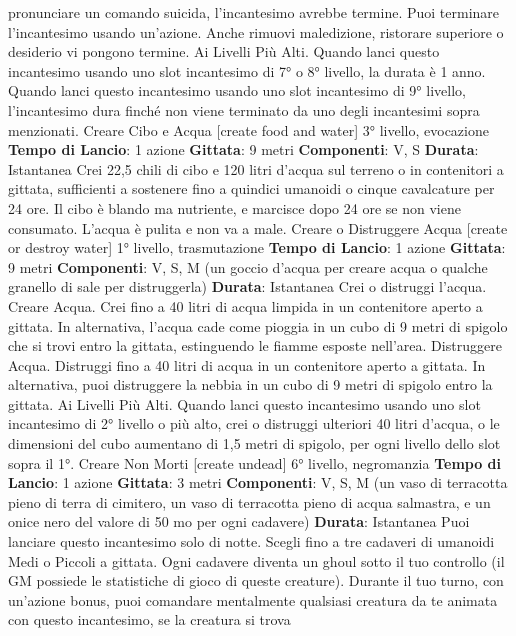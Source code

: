 \begin{multicols}{2}
pronunciare un comando suicida, l’incantesimo avrebbe
termine.
Puoi terminare l’incantesimo usando un’azione. Anche
rimuovi maledizione, ristorare superiore o desiderio vi
pongono termine.
Ai Livelli Più Alti. Quando lanci questo incantesimo
usando uno slot incantesimo di 7° o 8° livello, la durata
è 1 anno. Quando lanci questo incantesimo usando uno
slot incantesimo di 9° livello, l’incantesimo dura finché
non viene terminato da uno degli incantesimi sopra
menzionati.
Creare Cibo e Acqua
[create food and water]
3° livello, evocazione
\textbf{Tempo di Lancio}: 1 azione
\textbf{Gittata}: 9 metri
\textbf{Componenti}: V, S
\textbf{Durata}: Istantanea
Crei 22,5 chili di cibo e 120 litri d’acqua sul terreno o in
contenitori a gittata, sufficienti a sostenere fino a
quindici umanoidi o cinque cavalcature per 24 ore. Il
cibo è blando ma nutriente, e marcisce dopo 24 ore se
non viene consumato. L’acqua è pulita e non va a male.
Creare o Distruggere Acqua
[create or destroy water]
1° livello, trasmutazione
\textbf{Tempo di Lancio}: 1 azione
\textbf{Gittata}: 9 metri
\textbf{Componenti}: V, S, M (un goccio d’acqua per creare
acqua o qualche granello di sale per distruggerla)
\textbf{Durata}: Istantanea
Crei o distruggi l’acqua.
Creare Acqua. Crei fino a 40 litri di acqua limpida in un
contenitore aperto a gittata. In alternativa, l’acqua cade
come pioggia in un cubo di 9 metri di spigolo che si trovi
entro la gittata, estinguendo le fiamme esposte
nell’area.
Distruggere Acqua. Distruggi fino a 40 litri di acqua in
un contenitore aperto a gittata. In alternativa, puoi
distruggere la nebbia in un cubo di 9 metri di spigolo
entro la gittata.
Ai Livelli Più Alti. Quando lanci questo incantesimo
usando uno slot incantesimo di 2° livello o più alto, crei
o distruggi ulteriori 40 litri d’acqua, o le dimensioni del
cubo aumentano di 1,5 metri di spigolo, per ogni livello
dello slot sopra il 1°.
Creare Non Morti
[create undead]
6° livello, negromanzia
\textbf{Tempo di Lancio}: 1 azione
\textbf{Gittata}: 3 metri
\textbf{Componenti}: V, S, M (un vaso di terracotta pieno di
terra di cimitero, un vaso di terracotta pieno di acqua
salmastra, e un onice nero del valore di 50 mo per ogni
cadavere)
\textbf{Durata}: Istantanea
Puoi lanciare questo incantesimo solo di notte. Scegli
fino a tre cadaveri di umanoidi Medi o Piccoli a gittata.
Ogni cadavere diventa un ghoul sotto il tuo controllo (il
GM possiede le statistiche di gioco di queste creature).
Durante il tuo turno, con un’azione bonus, puoi
comandare mentalmente qualsiasi creatura da te
animata con questo incantesimo, se la creatura si trova

\end{multicols}
